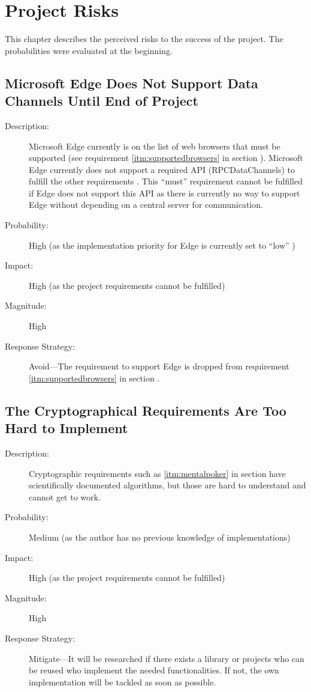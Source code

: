 \chapter{Project Risks}

This chapter describes the perceived risks to the success of the project. The
probabilities were evaluated at the beginning.

\section{Microsoft Edge Does Not Support Data Channels Until End of Project}
\label{sec:riskedgedatachannels}

\begin{description}
  \item[Description:] Microsoft Edge currently is on the list of web browsers
  that must be supported (see requirement \ref{itm:supportedbrowsers} in
  section ). Microsoft Edge currently does not support
  a required API (RPCDataChannels) to fulfill the other requirements
  \cite{Microsoft2016datachannels}. This “must” requirement cannot be fulfilled
  if Edge does not support this API as there is currently no way to support
  Edge without depending on a central server for communication.
  \item[Probability:] High (as the implementation priority for Edge is
  currently set to “low” \cite{Microsoft2016datachannels})
  \item[Impact:] High (as the project requirements cannot be fulfilled)
  \item[Magnitude:] High
  \item[Response Strategy:] Avoid---The requirement to support Edge is dropped
  from requirement \ref{itm:supportedbrowsers} in section
  .
\end{description}

\section{The Cryptographical Requirements Are Too Hard to Implement}

\begin{description}
  \item[Description:] Cryptographic requirements such as \ref{itm:mentalpoker}
  in section  have scientifically documented
  algorithms, but those are hard to understand and cannot get to work.
  \item[Probability:] Medium (as the author has no previous knowledge of
  implementations)
  \item[Impact:] High (as the project requirements cannot be fulfilled)
  \item[Magnitude:] High
  \item[Response Strategy:] Mitigate---It will be researched if there exists a
  library or projects who can be reused who implement the needed
  functionalities. If not, the own implementation will be tackled as soon as
  possible.
\end{description}

